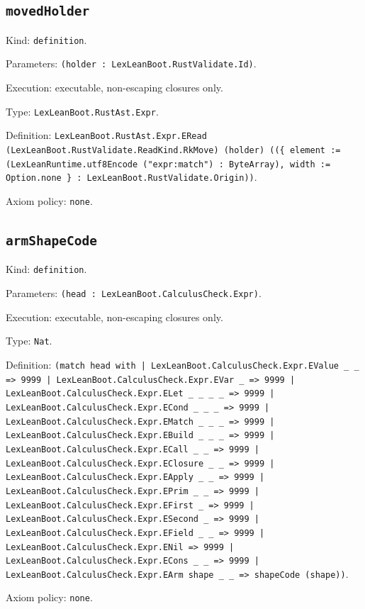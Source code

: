 \documentclass[11pt]{article}
\begin{document}
\subsection*{\texttt{movedHolder}}
\noindent Kind: \texttt{definition}.\par
\noindent Parameters: \texttt{(holder : LexLeanBoot.RustValidate.Id)}.\par
\noindent Execution: executable, non-escaping closures only.\par
\noindent Type: \texttt{LexLeanBoot.RustAst.Expr}.\par
\noindent Definition: \texttt{LexLeanBoot.RustAst.Expr.ERead (LexLeanBoot.RustValidate.ReadKind.RkMove) (holder) ((\{ element := (LexLeanRuntime.utf8Encode ("expr:match") : ByteArray), width := Option.none \} : LexLeanBoot.RustValidate.Origin))}.\par
\noindent Axiom policy: \texttt{none}.\par
\subsection*{\texttt{armShapeCode}}
\noindent Kind: \texttt{definition}.\par
\noindent Parameters: \texttt{(head : LexLeanBoot.CalculusCheck.Expr)}.\par
\noindent Execution: executable, non-escaping closures only.\par
\noindent Type: \texttt{Nat}.\par
\noindent Definition: \texttt{(match head with | LexLeanBoot.CalculusCheck.Expr.EValue \_ \_ => 9999 | LexLeanBoot.CalculusCheck.Expr.EVar \_ => 9999 | LexLeanBoot.CalculusCheck.Expr.ELet \_ \_ \_ \_ => 9999 | LexLeanBoot.CalculusCheck.Expr.ECond \_ \_ \_ => 9999 | LexLeanBoot.CalculusCheck.Expr.EMatch \_ \_ \_ => 9999 | LexLeanBoot.CalculusCheck.Expr.EBuild \_ \_ \_ => 9999 | LexLeanBoot.CalculusCheck.Expr.ECall \_ \_ => 9999 | LexLeanBoot.CalculusCheck.Expr.EClosure \_ \_ => 9999 | LexLeanBoot.CalculusCheck.Expr.EApply \_ \_ => 9999 | LexLeanBoot.CalculusCheck.Expr.EPrim \_ \_ => 9999 | LexLeanBoot.CalculusCheck.Expr.EFirst \_ => 9999 | LexLeanBoot.CalculusCheck.Expr.ESecond \_ => 9999 | LexLeanBoot.CalculusCheck.Expr.EField \_ \_ => 9999 | LexLeanBoot.CalculusCheck.Expr.ENil => 9999 | LexLeanBoot.CalculusCheck.Expr.ECons \_ \_ => 9999 | LexLeanBoot.CalculusCheck.Expr.EArm shape \_ \_ => shapeCode (shape))}.\par
\noindent Axiom policy: \texttt{none}.\par
\end{document}
